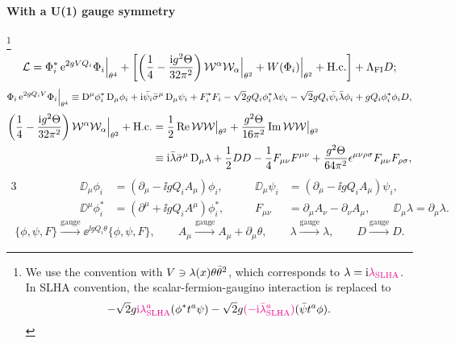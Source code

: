 \documentclass[CheatSheet]{subfiles}
\begin{document}
\paragraph{With a U(1) gauge symmetry}
\footnote{
We use the convention with $V\ni\lambda(x)\theta\bar\theta^2$, which corresponds to $\lambda=\mathrm{i}\color{magenta}\lambda_{\mathrm{SLHA}}$. In SLHA convention, the scalar-fermion-gaugino interaction is replaced to 
\begin{equation*}
  -\sqrt{2}g{\color{magenta}\mathrm{i}\lambda^a_{\mathrm{SLHA}}} (\phi^*t^a\psi)
 -\sqrt{2}g{\color{magenta}(-\mathrm{i}\bar\lambda^a_{\mathrm{SLHA}})}(\bar\psi t^a\phi).
\end{equation*}
}%
\begin{equation}
   \mathcal L =
\Phi^*_i \mathop{}\!\mathrm{e}^{2gV Q_i}\Phi_i\Big|_{\theta^4}
+
\biggl[
\left(\frac14 - \frac{\mathrm{i} g^2\Theta}{32\pi^2}\right)
\mathcal W^\alpha\mathcal W_\alpha\Big|_{\theta^2} +
W(\Phi_i)\Big|_{\theta^2} + \text{H.c.}
\biggr]
+
\Lambda_{\mathrm{FI}}D;
\end{equation}\vskip-18pt
\begin{equation}
\Phi_i \mathop{}\!\mathrm{e}^{2gQ_i V} \Phi_i\Big|_{\theta^4}
\equiv
\mathop{}\!\mathrm{D}^{\mu}\phi_i^*\mathop{}\!\mathrm{D}_{\mu}\phi_i
+\mathrm{i} \bar{\psi_i}\bar\sigma^{\mu}\mathop{}\!\mathrm{D}_{\mu}\psi_i
+F_i^*F_i
-\sqrt{2} g Q_i \phi_i^*\lambda\psi_i
-\sqrt{2} g Q_i \bar{\psi_i}\bar{\lambda}\phi_i
+g Q_i \phi_i^*\phi_i D,
\end{equation}\vskip-18pt
\begin{equation}
\begin{split}
 \left(\frac14 - \frac{\mathrm{i} g^2\Theta}{32\pi^2}\right)
 \mathcal W^\alpha\mathcal W_\alpha\Big|_{\theta^2}+\text{H.c.}
 &= \frac{1}{2}\mathop{\mathrm{Re}}\mathcal W\mathcal W\big|_{\theta^2}
 + \frac{g^2\Theta}{16\pi^2}\mathop{\mathrm{Im}}\mathcal W\mathcal W\big|_{\theta^2}
 \\
 &\equiv \mathrm{i}\bar{\lambda}\bar\sigma^{\mu}\mathop{}\!\mathrm{D}_{\mu}\lambda
 +\frac12DD
 -\frac14F_{\mu\nu}F^{\mu\nu}
 +\frac{g^2\Theta}{64\pi^2}\epsilon^{\mu \nu\rho\sigma}
 F_{\mu\nu}F_{\rho\sigma},
\end{split}
\end{equation}\vskip-18pt
\begin{alignat*}{3}
\qquad\qquad&&
 \DD_{\mu}\phi_i&=(\partial_\mu-\ii g Q_i A_\mu)\phi_i, \qquad&
 \DD_{\mu}\psi_i&=(\partial_\mu-\ii g Q_i A_\mu)\psi_i, \\&&
\DD^{\mu}\phi_i^*&=(\partial^\mu+\ii g Q_i A^\mu)\phi_i^*, &
 F_{\mu\nu} &= \partial_\mu A_\nu-\partial_\nu A_\mu,\qquad
\DD_\mu\lambda=\partial_\mu\lambda.
\end{alignat*}\vskip-18pt
\begin{equation}
  \{\phi,\psi,F\}\xrightarrow{\text{gauge}}
 \ee^{\ii g Q_i \theta}\{\phi,\psi,F\},\qquad
  A_\mu\xrightarrow{\text{gauge}} A_\mu+\partial_\mu \theta,\qquad
  \lambda\xrightarrow{\text{gauge}}\lambda,\qquad
  D\xrightarrow{\text{gauge}}D.
\end{equation}
\end{document}
